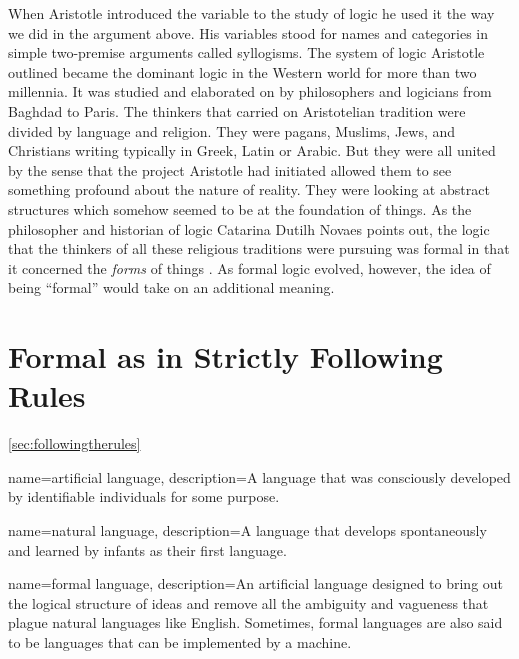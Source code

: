 When Aristotle introduced the variable to the study of logic he used it the way we did in the argument above. His variables stood for names and categories in simple two-premise arguments called syllogisms. The system of logic Aristotle outlined became the dominant logic in the Western world for more than two millennia. It was studied and elaborated on by philosophers and logicians from Baghdad to Paris. The thinkers that carried on Aristotelian tradition were divided by language and religion. They were pagans, Muslims, Jews, and Christians writing typically in Greek, Latin or Arabic. But they were all united by the sense that the project Aristotle had initiated allowed them to see something profound about the nature of reality. They were looking at abstract structures which somehow seemed to be at the foundation of things. As the philosopher and historian of logic Catarina Dutilh Novaes points out, the logic that the thinkers of all these religious traditions were pursuing was formal in that it concerned the \textit{forms} of things \citep{DutilhNovaes2011}. As formal logic evolved, however, the idea of being ``formal'' would take on an additional meaning.

\section{Formal as in Strictly Following Rules}\ref{sec:followingtherules}

{
name=artificial language,
description={A language that was consciously developed by identifiable individuals for some purpose.}
}

{
name=natural language,
description={A language that develops spontaneously and learned by infants as their first language.}
}

{
name=formal language,
description={An artificial language designed to bring out the logical structure of  ideas and remove all the ambiguity and vagueness that plague natural languages like English. Sometimes, formal languages are also said to be languages that can be implemented by a machine.}
}


